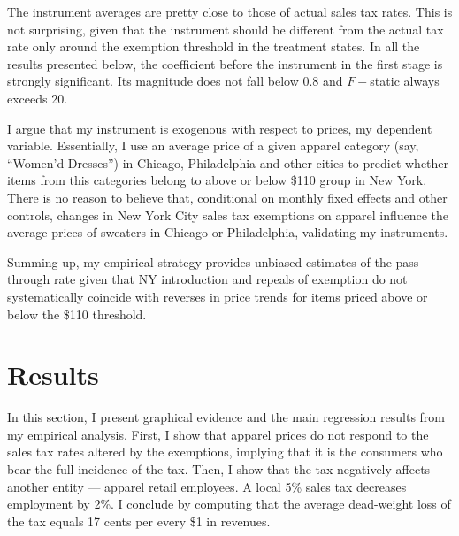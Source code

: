 \documentclass[12pt]{article}
\begin{document}
	The instrument averages are pretty close to those of actual sales tax rates. This is not surprising, given that the instrument should be different from the actual tax rate only around the exemption threshold in the treatment states. In all the results presented below, the coefficient before the instrument in the first stage is strongly significant. Its magnitude does not fall below 0.8 and $F-$static always exceeds 20.
	
	I argue that my instrument is exogenous with respect to prices, my dependent variable. Essentially, I use an average price of a given apparel category (say, ``Women'd Dresses'') in Chicago, Philadelphia and other cities to predict whether items from this categories belong to above or below \$110 group in New York. There is no reason to believe that, conditional on monthly fixed effects and other controls, changes in New York City sales tax exemptions on apparel influence the average prices of sweaters in Chicago or Philadelphia, validating my instruments. 
	
	Summing up, my empirical strategy provides unbiased estimates of the pass-through rate given that NY introduction and repeals of exemption do not systematically coincide with reverses in price trends for items priced above or below the \$110 threshold.
	

	
	
	\section{Results}
	\label{sec:res}
	In this section, I present graphical evidence and the main regression results from my empirical analysis. First, I show that apparel prices do not respond to the sales tax rates altered by the exemptions, implying that it is the consumers who bear the full incidence of the tax. Then, I show that the tax negatively affects another entity --- apparel retail employees. A local 5\% sales tax decreases employment by 2\%. I conclude by computing that the average dead-weight loss of the tax equals 17 cents per every \$1 in revenues.
	
	
	
\end{document}

